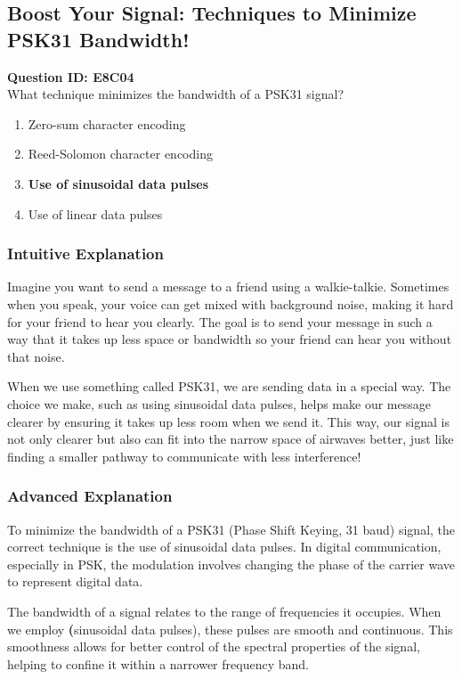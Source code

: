 \subsection{Boost Your Signal: Techniques to Minimize PSK31 Bandwidth!}

\begin{tcolorbox}
\textbf{Question ID: E8C04} \\
What technique minimizes the bandwidth of a PSK31 signal? 
\begin{enumerate}[label=\Alph*.]
    \item Zero-sum character encoding
    \item Reed-Solomon character encoding
    \item \textbf{Use of sinusoidal data pulses}
    \item Use of linear data pulses
\end{enumerate}
\end{tcolorbox}

\subsubsection{Intuitive Explanation}
Imagine you want to send a message to a friend using a walkie-talkie. Sometimes when you speak, your voice can get mixed with background noise, making it hard for your friend to hear you clearly. The goal is to send your message in such a way that it takes up less space or bandwidth so your friend can hear you without that noise. 

When we use something called PSK31, we are sending data in a special way. The choice we make, such as using sinusoidal data pulses, helps make our message clearer by ensuring it takes up less room when we send it. This way, our signal is not only clearer but also can fit into the narrow space of airwaves better, just like finding a smaller pathway to communicate with less interference!

\subsubsection{Advanced Explanation}
To minimize the bandwidth of a PSK31 (Phase Shift Keying, 31 baud) signal, the correct technique is the use of sinusoidal data pulses. In digital communication, especially in PSK, the modulation involves changing the phase of the carrier wave to represent digital data. 

The bandwidth of a signal relates to the range of frequencies it occupies. When we employ \textbf(sinusoidal data pulses), these pulses are smooth and continuous. This smoothness allows for better control of the spectral properties of the signal, helping to confine it within a narrower frequency band. 

